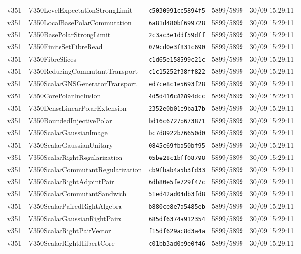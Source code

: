 \documentclass[11pt]{article}
\theoremstyle{definition}\newtheorem{deriv}{Derivação}
\begin{document}
{\begin{longtable}{@{}lllll@{}}
v351 & V350LevelExpectationStrongLimit & \texttt{c5030991cc5894f5} & 5899/5899 & 30/09 15:29:11 \\
v351 & V350LocalBasePolarCommutation & \texttt{6a81d480bf699728} & 5899/5899 & 30/09 15:29:11 \\
v351 & V350BasePolarStrongLimit & \texttt{2c3ac3e1ddf59dff} & 5899/5899 & 30/09 15:29:11 \\
v351 & V350FiniteSetFibreRead & \texttt{079cd0e3f831c690} & 5899/5899 & 30/09 15:29:11 \\
v351 & V350FibreSlices & \texttt{c1d65e158599c21c} & 5899/5899 & 30/09 15:29:11 \\
v351 & V350ReducingCommutantTransport & \texttt{c1c15252f38ff822} & 5899/5899 & 30/09 15:29:11 \\
v351 & V350ScalarGNSGeneratorTransport & \texttt{ed7ce8c1e5693f28} & 5899/5899 & 30/09 15:29:11 \\
v351 & V350CorePolarInclusion & \texttt{4d5d416c82894dcc} & 5899/5899 & 30/09 15:29:11 \\
v351 & V350DenseLinearPolarExtension & \texttt{2352e0b01e9ba17b} & 5899/5899 & 30/09 15:29:11 \\
v351 & V350BoundedInjectivePolar & \texttt{bd16c6727b673871} & 5899/5899 & 30/09 15:29:11 \\
v351 & V350ScalarGaussianImage & \texttt{bc7d8922b76650d0} & 5899/5899 & 30/09 15:29:11 \\
v351 & V350ScalarGaussianUnitary & \texttt{0845c69fba50bf95} & 5899/5899 & 30/09 15:29:11 \\
v351 & V350ScalarRightRegularization & \texttt{05be28c1bff08798} & 5899/5899 & 30/09 15:29:11 \\
v351 & V350ScalarCommutantRegularization & \texttt{cb9fbab4a5b3fd33} & 5899/5899 & 30/09 15:29:11 \\
v351 & V350ScalarRightAdjointPair & \texttt{6db80e5fe729f47c} & 5899/5899 & 30/09 15:29:11 \\
v351 & V350ScalarCommutantSandwich & \texttt{51ed42ad04db3fd8} & 5899/5899 & 30/09 15:29:11 \\
v351 & V350ScalarPairedRightAlgebra & \texttt{b880ce8e7a5485eb} & 5899/5899 & 30/09 15:29:11 \\
v351 & V350ScalarGaussianRightPairs & \texttt{685df6374a912354} & 5899/5899 & 30/09 15:29:11 \\
v351 & V350ScalarRightPairVector & \texttt{f15df629ac8d3a4a} & 5899/5899 & 30/09 15:29:11 \\
v351 & V350ScalarRightHilbertCore & \texttt{c01bb3ad0b9e0f46} & 5899/5899 & 30/09 15:29:11 \\

\end{longtable}}
\end{document}
